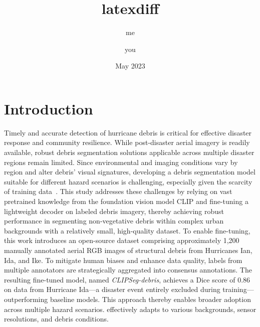 \documentclass{article}
\title{latexdiff}
\author{me\and you}
\date{May 2023}
\begin{document}
\maketitle

\section{Introduction}
Timely and accurate detection of hurricane debris is critical for effective disaster response and community resilience. While post-disaster aerial imagery is readily available, robust debris segmentation solutions applicable across multiple disaster regions remain limited.
Since environmental and imaging conditions vary by region and alter debris’ visual signatures, developing a debris segmentation model suitable for different hazard scenarios is challenging, especially given the scarcity of training data~\cite{wu2020phrasecut}.
This study addresses these challenges by relying on vast pretrained knowledge from the foundation vision model CLIP and fine-tuning a lightweight decoder on labeled debris imagery, thereby achieving robust performance in segmenting non-vegetative debris within complex urban backgrounds with a relatively small, high-quality dataset.
To enable fine-tuning, this work introduces an open-source dataset comprising approximately 1,200 manually annotated aerial RGB images of structural debris from Hurricanes Ian, Ida, and Ike.
To mitigate human biases and enhance data quality, labels from multiple annotators are strategically aggregated into consensus annotations.
The resulting fine-tuned model, named \emph{CLIPSeg-debris}, achieves a Dice score of 0.86 on data from Hurricane Ida---a disaster event entirely excluded during training---outperforming baseline models.
This approach thereby enables broader adoption across multiple hazard scenarios.
effectively adapts to various backgrounds, sensor resolutions, and debris conditions.



\end{document}
